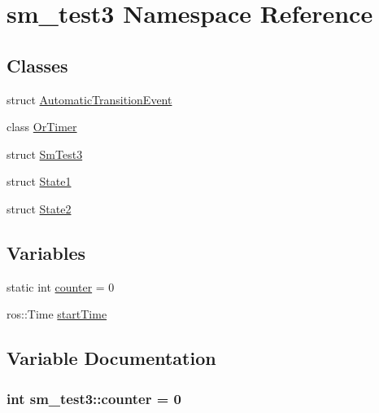 \hypertarget{namespacesm__test3}{}\section{sm\+\_\+test3 Namespace Reference}
\label{namespacesm__test3}
\subsection*{Classes}
\begin{DoxyCompactItemize}
\item 
struct \hyperlink{structsm__test3_1_1AutomaticTransitionEvent}{Automatic\+Transition\+Event}
\item 
class \hyperlink{classsm__test3_1_1OrTimer}{Or\+Timer}
\item 
struct \hyperlink{structsm__test3_1_1SmTest3}{Sm\+Test3}
\item 
struct \hyperlink{structsm__test3_1_1State1}{State1}
\item 
struct \hyperlink{structsm__test3_1_1State2}{State2}
\end{DoxyCompactItemize}
\subsection*{Variables}
\begin{DoxyCompactItemize}
\item 
static int \hyperlink{namespacesm__test3_ab58afc60ebc0becda5535ba21c5a310a}{counter} = 0
\item 
ros\+::\+Time \hyperlink{namespacesm__test3_a3c530a2f1d2f50afbd4e56e96c1edd83}{start\+Time}
\end{DoxyCompactItemize}


\subsection{Variable Documentation}
\subsubsection[{\texorpdfstring{counter}{counter}}]{\setlength{\rightskip}{0pt plus 5cm}int sm\+\_\+test3\+::counter = 0\hspace{0.3cm}{\ttfamily [static]}}\hypertarget{namespacesm__test3_ab58afc60ebc0becda5535ba21c5a310a}{}\label{namespacesm__test3_ab58afc60ebc0becda5535ba21c5a310a}


